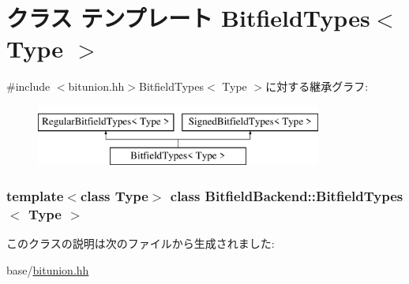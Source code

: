\hypertarget{classBitfieldBackend_1_1BitfieldTypes}{
\section{クラス テンプレート BitfieldTypes$<$ Type $>$}
\label{classBitfieldBackend_1_1BitfieldTypes}
}


{\ttfamily \#include $<$bitunion.hh$>$}BitfieldTypes$<$ Type $>$に対する継承グラフ:\begin{figure}[H]
\begin{center}
\leavevmode
\includegraphics[height=2cm]{classBitfieldBackend_1_1BitfieldTypes}
\end{center}
\end{figure}
\subsubsection*{template$<$class Type$>$ class BitfieldBackend::BitfieldTypes$<$ Type $>$}



このクラスの説明は次のファイルから生成されました:\begin{DoxyCompactItemize}
\item 
base/\hyperlink{bitunion_8hh}{bitunion.hh}\end{DoxyCompactItemize}

